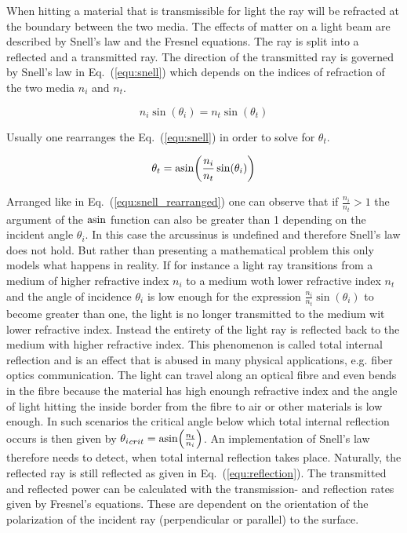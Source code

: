 \documentclass[a4paper,10pt]{article}
\newcommand{\equref}[1]{Eq.~(\ref{#1})}
\begin{document}
    When hitting a material that is transmissible for light the ray
    will be refracted at the boundary between the two media.
    The effects of matter on a light beam are described by Snell's law
    and the Fresnel equations.
    The ray is split into a reflected and a transmitted ray.
    The direction of the transmitted ray is governed by Snell's law in \equref{equ:snell}
    which depends on the indices of refraction of the two media $n_i$ and $n_t$.

    \begin{equation}
        \label{equ:snell}
        n_i \sin(\theta_i) = n_t \sin(\theta_t)
    \end{equation}

    Usually one rearranges the \equref{equ:snell} in order to solve
    for $\theta_t$.
    
    \begin{equation}
        \label{equ:snell_rearranged}
        \theta_t = \asin(\frac{n_i}{n_t} \sin(\theta_i))
    \end{equation}

    Arranged like in \equref{equ:snell_rearranged} one can observe
    that if $\frac{n_i}{n_t} > 1$ the argument of the $\asin$ function
    can also be greater than 1 depending on the incident angle
    $\theta_i$.
    In this case the arcussinus is undefined and therefore Snell's 
    law does not hold.
    But rather than presenting a mathematical problem this only
    models what happens in reality.
    If for instance a light ray transitions from a medium of higher
    refractive index $n_i$ to a medium woth lower refractive index
    $n_t$ and the angle of incidence $\theta_i$ is low enough
    for the expression $\frac{n_i}{n_t} \sin(\theta_i)$ to become
    greater than one, the light is no longer transmitted to the 
    medium wit lower refractive index.
    Instead the entirety of the light ray is reflected back to the
    medium with higher refractive index.
    This phenomenon is called total internal reflection and is an 
    effect that is abused in many physical applications, e.g.
    fiber optics communication.
    The light can travel along an optical fibre and even bends in the fibre
    because the material has high enoungh refractive index and the angle
    of light hitting the inside border from the fibre to air or other
    materials is low enough.
    In such scenarios the critical angle below which total internal reflection occurs is
    then given by ${\theta_i}_{crit} = \asin(\frac{n_t}{n_i})$. 
    An implementation of Snell's law therefore needs to detect, when
    total internal reflection takes place.
    Naturally, the reflected ray is still reflected as given in
    \equref{equ:reflection}.
    The transmitted and reflected power can be calculated with the transmission- and
    reflection rates given by Fresnel's equations.
    These are dependent on the orientation of the polarization of the incident ray
    (perpendicular or parallel) to the surface.
\end{document}
